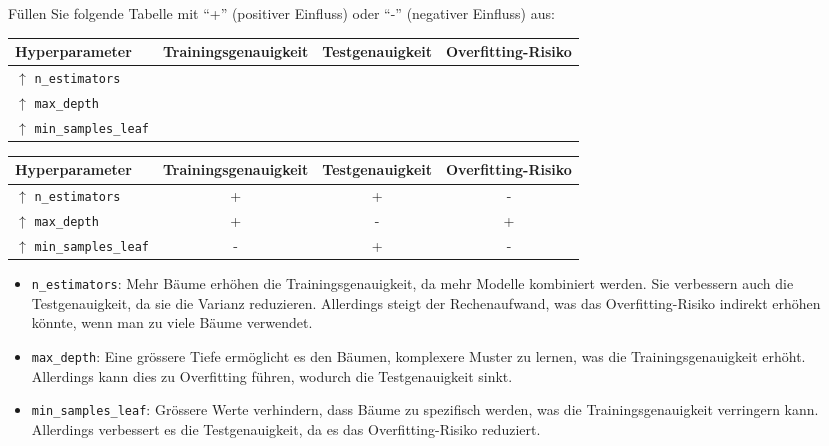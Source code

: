\begin{myexercise}
    Füllen Sie folgende Tabelle mit \enquote{+} (positiver Einfluss) oder \enquote{-} (negativer Einfluss) aus:
    \begin{center}
        \begin{tabular}{l|c|c|c}
            Hyperparameter & Trainingsgenauigkeit & Testgenauigkeit & Overfitting-Risiko \\
            \hline
            $\uparrow$ \texttt{n\_estimators} &  &  &  \\
            $\uparrow$ \texttt{max\_depth} &  &  &  \\
            $\uparrow$ \texttt{min\_samples\_leaf} &  &  &  
        \end{tabular}
    \end{center}
    \begin{myanswer}
        \begin{center}
            \begin{tabular}{l|c|c|c}
                Hyperparameter & Trainingsgenauigkeit & Testgenauigkeit & Overfitting-Risiko \\
                \hline
                $\uparrow$ \texttt{n\_estimators} & + & + & - \\
                $\uparrow$ \texttt{max\_depth} & + & - & + \\
                $\uparrow$ \texttt{min\_samples\_leaf} & - & + & - 
            \end{tabular}
        \end{center}
        \begin{itemize}
            \item \texttt{n\_estimators}: Mehr Bäume erhöhen die Trainingsgenauigkeit, da mehr Modelle kombiniert werden. Sie verbessern auch die Testgenauigkeit, da sie die Varianz reduzieren. Allerdings steigt der Rechenaufwand, was das Overfitting-Risiko indirekt erhöhen könnte, wenn man zu viele Bäume verwendet.
            \item \texttt{max\_depth}: Eine grössere Tiefe ermöglicht es den Bäumen, komplexere Muster zu lernen, was die Trainingsgenauigkeit erhöht. Allerdings kann dies zu Overfitting führen, wodurch die Testgenauigkeit sinkt.
            \item \texttt{min\_samples\_leaf}: Grössere Werte verhindern, dass Bäume zu spezifisch werden, was die Trainingsgenauigkeit verringern kann. Allerdings verbessert es die Testgenauigkeit, da es das Overfitting-Risiko reduziert.
        \end{itemize}
     \end{myanswer}
\end{myexercise}

